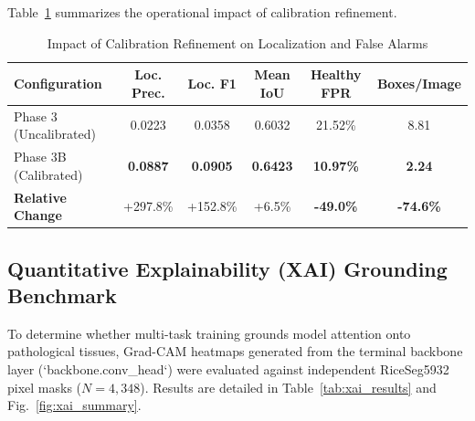 \documentclass[conference]{IEEEtran}
\begin{document}
Table~\ref{tab:calibration_ablation} summarizes the operational impact of calibration refinement.

\begin{table}[htbp]
\centering
\caption{Impact of Calibration Refinement on Localization and False Alarms}
\label{tab:calibration_ablation}
\footnotesize
\setlength{\tabcolsep}{3.5pt}
\begin{tabular}{lccccc}
\toprule
\textbf{Configuration} & \textbf{Loc. Prec.} & \textbf{Loc. F1} & \textbf{Mean IoU} & \textbf{Healthy FPR} & \textbf{Boxes/Image} \\
\midrule
Phase 3 (Uncalibrated) & 0.0223 & 0.0358 & 0.6032 & 21.52\% & 8.81 \\
Phase 3B (Calibrated) & \textbf{0.0887} & \textbf{0.0905} & \textbf{0.6423} & \textbf{10.97\%} & \textbf{2.24} \\
\midrule
\textbf{Relative Change} & +297.8\% & +152.8\% & +6.5\% & \textbf{-49.0\%} & \textbf{-74.6\%} \\
\bottomrule
\end{tabular}
\end{table}

\subsection{Quantitative Explainability (XAI) Grounding Benchmark}
To determine whether multi-task training grounds model attention onto pathological tissues, Grad-CAM heatmaps generated from the terminal backbone layer (`backbone.conv_head`) were evaluated against independent RiceSeg5932 pixel masks ($N=4,348$). Results are detailed in Table~\ref{tab:xai_results} and Fig.~\ref{fig:xai_summary}.
\end{document}

